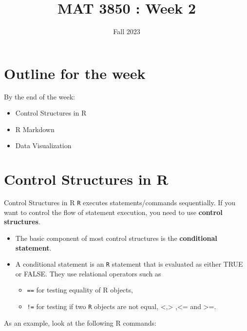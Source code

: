 \documentclass[
  ignorenonframetext,
]{beamer}
\title{MAT 3850 : Week 2}
\author{Fall 2023}
\date{}
\institute{App State}
\providecommand{\tightlist}{%
  \setlength{\itemsep}{0pt}\setlength{\parskip}{0pt}}
\begin{document}
\frame{\titlepage}

\hypertarget{outline-for-the-week}{%
\section{Outline for the week}\label{outline-for-the-week}}

\begin{frame}{By the end of the week:}
\protect\hypertarget{by-the-end-of-the-week}{}
\begin{itemize}
\tightlist
\item
  Control Structures in R
\item
  R Markdown
\item
  Data Visualization
\end{itemize}
\end{frame}

\hypertarget{control-structures-in-r}{%
\section{Control Structures in R}\label{control-structures-in-r}}

\begin{frame}[fragile]{Control Structures in R}
\protect\hypertarget{control-structures-in-r-1}{}
\texttt{R} executes statements/commands sequentially. If you want to
control the flow of statement execution, you need to use \textbf{control
structures}.

\begin{itemize}
\item
  The basic component of most control structures is the
  \textbf{conditional statement}.
\item
  A conditional statement is an \texttt{R} statement that is evaluated
  as either TRUE or FALSE. They use relational operators such as

  \begin{itemize}
  \tightlist
  \item
    \texttt{==} for testing equality of R objects,
  \item
    \texttt{!=} for testing if two \texttt{R} objects are not equal,
    \textless,\textgreater{} ,\textless= and \textgreater=.
  \end{itemize}
\end{itemize}

As an example, look at the following R commands:
\end{frame}
\end{document}
